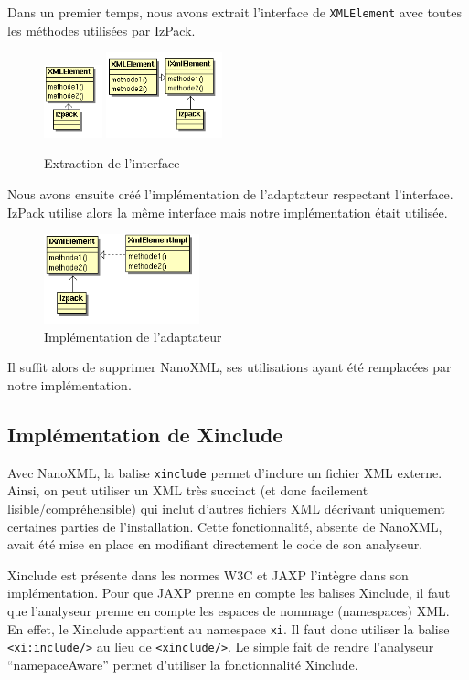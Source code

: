 Dans un premier temps, nous avons extrait l'interface de \verb|XMLElement| avec toutes les méthodes utilisées par IzPack.
\begin{figure}[H]
	\centering
	\includegraphics[width=0.15\textwidth]{../image/sol_casInitial.png}
	\hfil
	\includegraphics[width=0.3\textwidth]{../image/sol_extractionInterface.png}
	\caption{Extraction de l'interface}
\end{figure}
Nous avons ensuite créé l'implémentation de l'adaptateur respectant l'interface.
IzPack utilise alors la même interface mais notre implémentation était utilisée.
\begin{figure}[H]
	\centering
	\includegraphics[width=0.4\textwidth]{../image/sol_implementation.png}
	\caption{Implémentation de l'adaptateur}
\end{figure}
Il suffit alors de supprimer NanoXML, ses utilisations ayant été remplacées par notre implémentation.
\subsection{Implémentation de Xinclude}
Avec NanoXML, la balise \verb|xinclude| permet d'inclure un fichier XML externe.
Ainsi, on peut utiliser un XML très succinct (et donc facilement lisible/compréhensible) qui inclut d'autres fichiers XML décrivant uniquement certaines parties de l'installation.
Cette fonctionnalité, absente de NanoXML, avait été mise en place en modifiant directement le code de son analyseur.

Xinclude est présente dans les normes W3C et JAXP l'intègre dans son implémentation.
Pour que JAXP prenne en compte les balises Xinclude, il faut que l'analyseur prenne en compte les espaces de nommage (namespaces) XML.
En effet, le Xinclude appartient au namespace \verb|xi|.
Il faut donc utiliser la balise \verb|<xi:include/>| au lieu de \verb|<xinclude/>|.
Le simple fait de rendre l'analyseur ``namepaceAware'' permet d'utiliser la fonctionnalité Xinclude.
